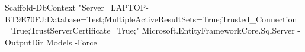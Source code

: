 


Scaffold-DbContext "Server=LAPTOP-BT9E70FJ\SQLEXPRESS;Database=Test;MultipleActiveResultSets=True;Trusted_Connection=True;TrustServerCertificate=True;" Microsoft.EntityFrameworkCore.SqlServer -OutputDir Models -Force